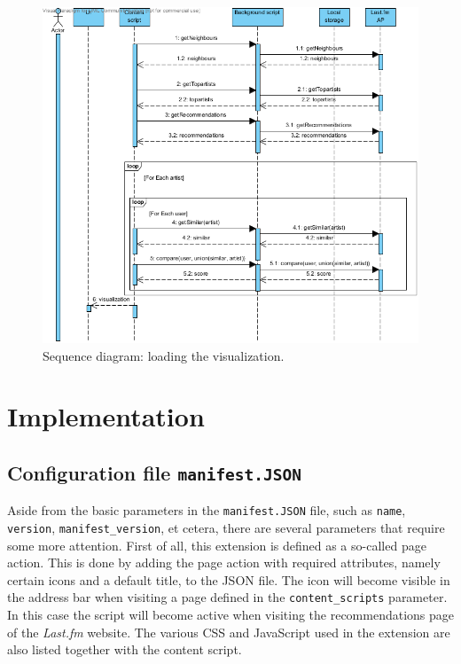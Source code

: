 \begin{figure}%
	\begin{center}
		\includegraphics[width=\columnwidth]{img/seq_load_visualization}%
	\end{center}
	\caption{Sequence diagram: loading the visualization.}%
	\label{fig:sequence:loadingvis}%
\end{figure}



\section{Implementation}\label{chapter:implementation:section:implementation}

\subsection{Configuration file \texttt{manifest.JSON}}\label{chapter:implementation:section:implementation:subsection:configuration}

Aside from the basic parameters in the \texttt{manifest.JSON} file, such as \texttt{name}, \texttt{version}, \texttt{manifest\_version}, et cetera, there are several parameters that require some more attention. First of all, this extension is defined as a so-called page action. This is done by adding the page action with required attributes, namely certain icons and a default title, to the JSON file. The icon will become visible in the address bar when visiting a page defined in the \texttt{content\_scripts} parameter. In this case the script will become active when visiting the recommendations page of the \emph{Last.fm} website. The various CSS and JavaScript used in the extension are also listed together with the content script.

